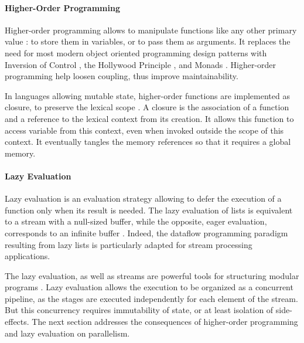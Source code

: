 \paragraph{Higher-Order Programming}

Higher-order programming allows to manipulate functions like any other primary value : to store them in variables, or to pass them as arguments.
It replaces the need for most modern object oriented programming design patterns  with Inversion of Control \cite{Johnson}, the Hollywood Principle \cite{Sweet1985}, and Monads \cite{Wadler1992}.
Higher-order programming help loosen coupling, thus improve maintainability.

In languages allowing mutable state, higher-order functions are implemented as closure, to preserve the lexical scope \cite{Sussman1998}.
A closure is the association of a function and a reference to the lexical context from its creation.
It allows this function to access variable from this context, even when invoked outside the scope of this context.
It eventually tangles the memory references so that it requires a global memory.

\paragraph{Lazy Evaluation}

Lazy evaluation is an evaluation strategy allowing to defer the execution of a function only when its result is needed.
The lazy evaluation of lists is equivalent to a stream with a null-sized buffer, while the opposite, eager evaluation, corresponds to an infinite buffer \cite{VanRoy2003}.
Indeed, the dataflow programming paradigm resulting from lazy lists is particularly adapted for stream processing applications.

The lazy evaluation, as well as streams are powerful tools for structuring modular programs \cite{Sussman1983}.
Lazy evaluation allows the execution to be organized as a concurrent pipeline, as the stages are executed independently for each element of the stream.
But this concurrency requires immutability of state, or at least isolation of side-effects.
The next section addresses the consequences of higher-order programming and lazy evaluation on parallelism.


